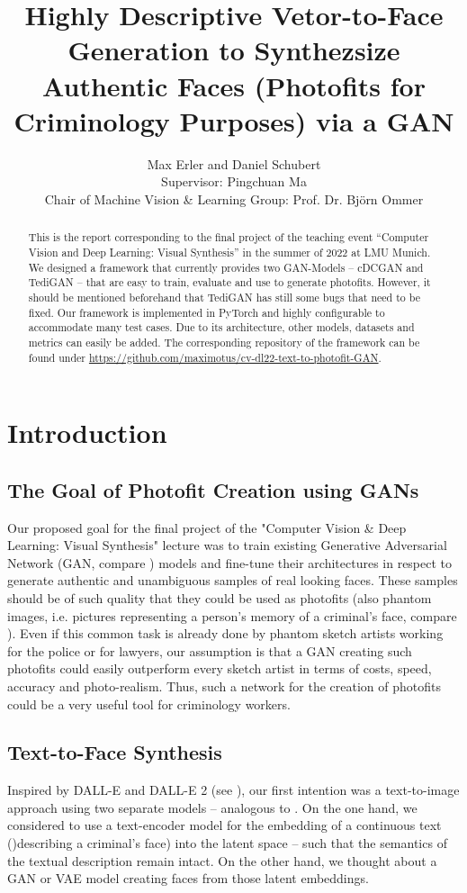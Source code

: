 \documentclass[12pt, a4paper]{article}
\title{Highly Descriptive Vetor-to-Face Generation to Synthezsize Authentic Faces (Photofits for Criminology Purposes) via a GAN}
\author{Max Erler and Daniel Schubert\\
Supervisor: Pingchuan Ma\\
Chair of Machine Vision \& Learning Group: Prof. Dr. Björn Ommer}
\begin{document}
\maketitle
\begin{abstract}
    This is the report corresponding to the final project of the teaching event ``Computer Vision and Deep Learning: Visual Synthesis'' in the summer of 2022 at LMU Munich.
    We designed a framework that currently provides two GAN-Models -- cDCGAN and TediGAN -- that are easy to train, evaluate and use to generate photofits.
    However, it should be mentioned beforehand that TediGAN has still some bugs that need to be fixed.
    Our framework is implemented in PyTorch and highly configurable to accommodate many test cases.
    Due to its architecture, other models, datasets and metrics can easily be added.
    The corresponding repository of the framework can be found under
    \href{https://github.com/maximotus/cv-dl22-text-to-photofit-GAN}{https://github.com/maximotus/cv-dl22-text-to-photofit-GAN}.
    \end{abstract}
\pagebreak
\tableofcontents
\pagebreak
\section{Introduction}
\subsection{The Goal of Photofit Creation using GANs}
\label{goal}
Our proposed goal for the final project of the "Computer Vision \& Deep Learning: Visual Synthesis" lecture was to train 
existing Generative Adversarial Network (GAN, compare \cite{gan}) models and fine-tune their architectures in respect to generate authentic
and unambiguous samples of real looking faces. These samples should be of such quality that they could be used as
photofits (also phantom images, i.e. pictures representing a person's memory of a criminal's face, compare \cite{photofitDef}).
Even if this common task is already done by phantom sketch artists working for the police or for lawyers, our assumption
is that a GAN creating such photofits could easily outperform every sketch artist in terms of costs, speed, accuracy and photo-realism.
Thus, such a network for the creation of photofits could be a very useful tool for criminology workers.

\subsection{Text-to-Face Synthesis}
Inspired by DALL-E and DALL-E 2 (see \cite{dallE}), our first intention was a text-to-image approach
using two separate models -- analogous to \cite{Xia_2021_CVPR}. On the one hand, we considered to
use a text-encoder model for the embedding of a continuous text ()describing a criminal's face) into the latent space --
such that the semantics of the textual description remain intact. On the other hand, we thought about a GAN or VAE model
creating faces from those latent embeddings.
\end{document}
